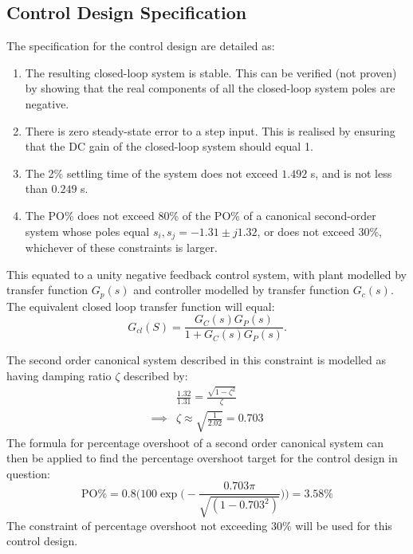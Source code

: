 \documentclass[11pt,a4paper]{article}
\begin{document}
\subsection{Control Design Specification}
The specification for the control design are detailed as:
\begin{enumerate}[label=\roman*., ref=\thesubsection(\roman*)]
    \item 
    The resulting closed-loop system is stable. This can be verified
    (not proven) by showing that the real components of all the
    closed-loop system poles are negative.
    \label{spec:stability}

    \item 
    There is zero steady-state error to a step input. This is realised
    by ensuring that the DC gain of the closed-loop system should equal 1.
    \label{spec:sse}

    \item 
    The 2\% settling time of the system does not exceed $1.492$ s,
    and is not less than $0.249$ s.
    \label{spec:settling}

    \item 
    The PO\% does not exceed 80\% of the PO\% of a canonical second-order
    system whose poles equal
    $s_i, s_j = -1.31 \pm j1.32$, or does not exceed 30\%, whichever of
    these constraints is larger.
    \label{spec:overshoot}
\end{enumerate}

This equated to a unity negative feedback control system, with plant modelled by transfer function $G_p(s)$ and controller modelled by transfer function $G_c(s)$. The equivalent closed loop transfer function will equal:
\begin{equation}
G_{cl}(S)=\frac{G_C(s)G_P(s)}{1+G_C(s)G_P(s)}.
\label{eq:g_cl_general}
\end{equation}

The second order canonical system described in this constraint is modelled as having damping ratio $\zeta$ described by: 
\begin{align*}
    &\frac{1.32}{1.31} = \frac{\sqrt{1 - \zeta^2}}{\zeta} \\
    \implies &\zeta \approx \sqrt{\frac{1}{2.02}} = 0.703
\end{align*}
The formula for percentage overshoot of a second order canonical system can then be applied to find the percentage overshoot target for the control design in question:
$$
    \text{PO\%} = 0.8\bigg(100 \exp \big(-\frac{0.703 \pi}{\sqrt{(1 - 0.703^2)}} \big) \bigg) = 3.58\%
$$
The constraint of percentage overshoot not exceeding 30\% will be used for this control design.
\end{document}

